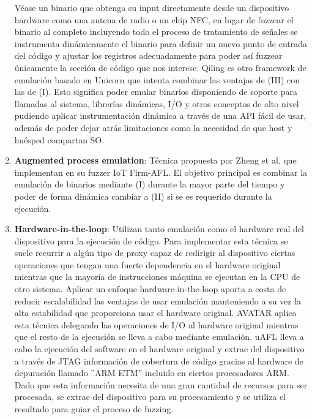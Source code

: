 \begin{enumerate}[I]
    Véase un binario que obtenga su 
    input directamente desde un dispositivo hardware como una antena de radio o un chip NFC, en lugar de fuzzear el binario al completo incluyendo todo el 
    proceso de tratamiento de señales se instrumenta dinámicamente el binario para definir un nuevo punto de entrada del código y ajustar los registros
    adecuadamente para poder así fuzzear únicamente la sección de código que nos interese. Qiling\cite{qiling} es otro framework de emulación basado en
    Unicorn\cite{unicorn} que intenta combinar las ventajas de (III) con las de (I). Esto significa poder emular binarios disponiendo de soporte 
    para llamadas al sistema, librerías dinámicas, I/O y otros conceptos de alto nivel pudiendo aplicar instrumentación dinámica a través de una API fácil 
    de usar, además de poder dejar atrás limitaciones como la necesidad de que host y huésped compartan SO.
    \item \textbf{Augmented process emulation}: Técnica propuesta por Zheng et al.\cite{Zheng2019} que implementan en su fuzzer IoT Firm-AFL. El objetivo 
    principal es combinar la emulación de binarios mediante (I) durante la mayor parte del tiempo y poder de forma dinámica cambiar a (II) si se es 
    requerido durante la ejecución.
    \item \textbf{Hardware-in-the-loop}: Utilizan tanto emulación como el hardware real del dispositivo para la ejecución de código. Para implementar esta 
    técnica se suele recurrir a algún tipo de proxy capaz de redirigir al dispositivo ciertas operaciones que tengan una fuerte dependencia en el hardware
    original mientras que la mayoría de instrucciones máquina se ejecutan en la CPU de otro sistema. Aplicar un enfoque hardware-in-the-loop aporta a costa 
    de reducir escalabilidad las ventajas de usar emulación manteniendo a su vez la alta estabilidad que proporciona usar el hardware original.
    AVATAR\cite{Zaddach2014} aplica esta técnica delegando las operaciones de I/O al hardware original mientras que el resto de la ejecución se lleva a 
    cabo mediante emulación. uAFL\cite{uAFL} lleva a cabo la ejecución del software en el hardware original y extrae del dispositivo a través de JTAG
    información de cobertura de código gracias al hardware de depuración llamado ''ARM ETM'' incluido en ciertos procesadores ARM. Dado que 
    esta información necesita de una gran cantidad de recursos para ser procesada, se extrae del dispositivo para su procesamiento y se utiliza el resultado
    para guiar el proceso de fuzzing.
\end{enumerate}

